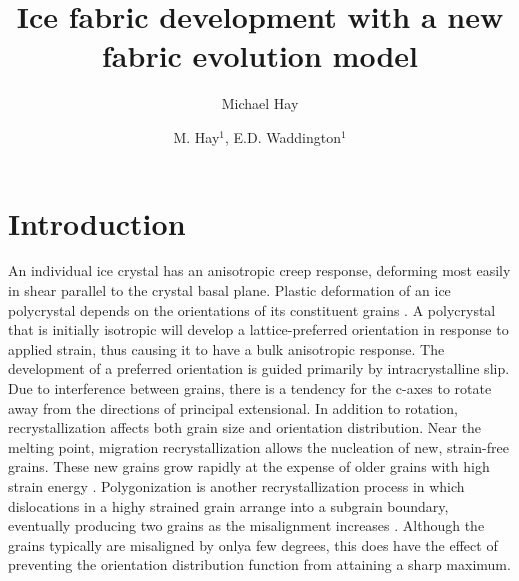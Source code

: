 \documentclass{igs}
\begin{document}
\title{Ice fabric development with a new fabric evolution model}

\author{Michael Hay}

\author[Hay and Waddington]{M. Hay$^1$, E.D. Waddington$^1$}





\maketitle 

\section{Introduction}
An individual ice crystal has an anisotropic creep response, deforming most easily in shear parallel to the crystal basal plane. Plastic deformation of an ice polycrystal depends on the orientations of its constituent grains \citep{azuma94}. A polycrystal that is initially isotropic will develop a lattice-preferred orientation in response to applied strain, thus causing it to have a bulk anisotropic response. The development of a preferred orientation is guided primarily by intracrystalline slip. Due to interference between grains, there is a tendency for the c-axes to rotate away from the directions of principal extensional. In addition to rotation, recrystallization affects both grain size and orientation distribution. Near the melting point, migration recrystallization allows the nucleation of new, strain-free grains. These new grains grow rapidly at the expense of older grains with high strain energy \citep{duval1995}. Polygonization is another recrystallization process in which dislocations in a highy strained grain arrange into a subgrain boundary, eventually producing two grains as the misalignment increases \citep{alley97}. Although the grains typically are misaligned by onlya few degrees, this does have the effect of preventing the orientation distribution function from attaining a sharp maximum.
\end{document}

